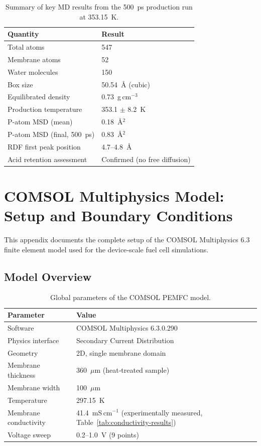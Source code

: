 \documentclass[12pt,a4paper]{report}
\begin{document}
\begin{table}[h]
\centering
\caption{Summary of key MD results from the 500~ps production 
run at 353.15~K.}
\label{tab:md-summary}
\begin{tabular}{ll}
\toprule
Quantity & Result \\
\midrule
Total atoms & 547 \\
Membrane atoms & 52 \\
Water molecules & 150 \\
Box size & 50.54~\AA{} (cubic) \\
Equilibrated density & 0.73~g\,cm\(^{-3}\) \\
Production temperature & 353.1 $\pm$ 8.2~K \\
P-atom MSD (mean) & 0.18~\AA\(^2\) \\
P-atom MSD (final, 500~ps) & 0.83~\AA\(^2\) \\
RDF first peak position & 4.7--4.8~\AA{} \\
Acid retention assessment & Confirmed (no free diffusion) \\
\bottomrule
\end{tabular}
\end{table}

\chapter{COMSOL Multiphysics Model: Setup and Boundary Conditions}

This appendix documents the complete setup of the COMSOL 
Multiphysics 6.3 finite element model used for the device‑scale 
fuel cell simulations.

\section{Model Overview}

\begin{table}[h]
\centering
\caption{Global parameters of the COMSOL PEMFC model.}
\label{tab:comsol-global}
\begin{tabular}{ll}
\toprule
Parameter & Value \\
\midrule
Software & COMSOL Multiphysics 6.3.0.290 \\
Physics interface & Secondary Current Distribution \\
Geometry & 2D, single membrane domain \\
Membrane thickness & 360~\(\mu\)m (heat‑treated sample) \\
Membrane width & 100~\(\mu\)m \\
Temperature & 297.15~K \\
Membrane conductivity & 41.4~mS\,cm\(^{-1}\) (experimentally measured, 
                          Table~\ref{tab:conductivity-results}) \\
Voltage sweep & 0.2--1.0~V (9 points) \\
\bottomrule
\end{tabular}
\end{table}
\end{document}
